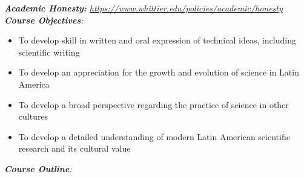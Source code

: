 \documentclass[10pt]{article}
\begin{document}
\textit{\textbf{Academic Honesty:} \url{https://www.whittier.edu/policies/academic/honesty}} \\
\noindent
\textit{\textbf{Course Objectives}:}
\begin{itemize}
\item To develop skill in written and oral expression of technical ideas, including scientific writing
\item To develop an appreciation for the growth and evolution of science in Latin America
\item To develop a broad perspective regarding the practice of science in other cultures
\item To develop a detailed understanding of modern Latin American scientific research and its cultural value
\end{itemize}
\clearpage
\twocolumn
\textit{\textbf{Course Outline}:}
\end{document}
